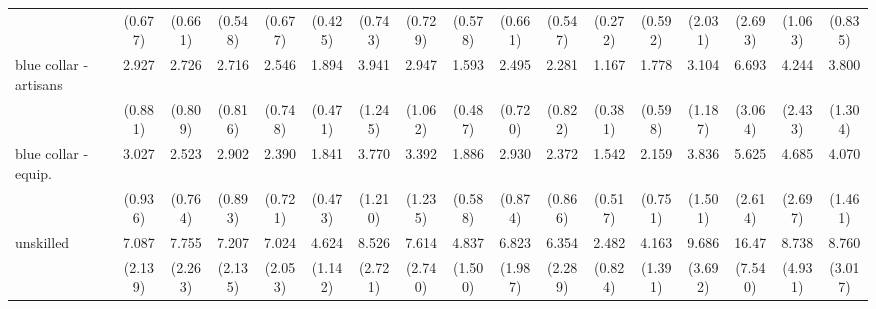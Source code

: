{\begin{tabular}{l*{16}{c}}
                    &     (0.677)         &     (0.661)         &     (0.548)         &     (0.677)         &     (0.425)         &     (0.743)         &     (0.729)         &     (0.578)         &     (0.661)         &     (0.547)         &     (0.272)         &     (0.592)         &     (2.031)         &     (2.693)         &     (1.063)         &     (0.835)         \\
[1em]
blue collar - artisans&       2.927\sym{***}&       2.726\sym{***}&       2.716\sym{***}&       2.546\sym{**} &       1.894\sym{*}  &       3.941\sym{***}&       2.947\sym{**} &       1.593         &       2.495\sym{**} &       2.281\sym{*}  &       1.167         &       1.778         &       3.104\sym{**} &       6.693\sym{***}&       4.244\sym{*}  &       3.800\sym{***}\\
                    &     (0.881)         &     (0.809)         &     (0.816)         &     (0.748)         &     (0.471)         &     (1.245)         &     (1.062)         &     (0.487)         &     (0.720)         &     (0.822)         &     (0.381)         &     (0.598)         &     (1.187)         &     (3.064)         &     (2.433)         &     (1.304)         \\
[1em]
blue collar - equip.&       3.027\sym{***}&       2.523\sym{**} &       2.902\sym{***}&       2.390\sym{**} &       1.841\sym{*}  &       3.770\sym{***}&       3.392\sym{***}&       1.886\sym{*}  &       2.930\sym{***}&       2.372\sym{*}  &       1.542         &       2.159\sym{*}  &       3.836\sym{***}&       5.625\sym{***}&       4.685\sym{**} &       4.070\sym{***}\\
                    &     (0.936)         &     (0.764)         &     (0.893)         &     (0.721)         &     (0.473)         &     (1.210)         &     (1.235)         &     (0.588)         &     (0.874)         &     (0.866)         &     (0.517)         &     (0.751)         &     (1.501)         &     (2.614)         &     (2.697)         &     (1.461)         \\
[1em]
unskilled           &       7.087\sym{***}&       7.755\sym{***}&       7.207\sym{***}&       7.024\sym{***}&       4.624\sym{***}&       8.526\sym{***}&       7.614\sym{***}&       4.837\sym{***}&       6.823\sym{***}&       6.354\sym{***}&       2.482\sym{**} &       4.163\sym{***}&       9.686\sym{***}&       16.47\sym{***}&       8.738\sym{***}&       8.760\sym{***}\\
                    &     (2.139)         &     (2.263)         &     (2.135)         &     (2.053)         &     (1.142)         &     (2.721)         &     (2.740)         &     (1.500)         &     (1.987)         &     (2.289)         &     (0.824)         &     (1.391)         &     (3.692)         &     (7.540)         &     (4.931)         &     (3.017)         \\

\end{tabular}}
